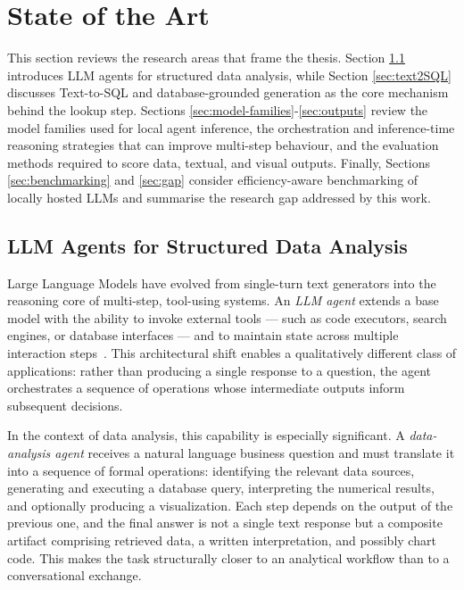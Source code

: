 \section{State of the Art}
\label{sec:stateofart}

This section reviews the research areas that frame the thesis. Section \ref{sec:LLM-data}
introduces LLM agents for structured data analysis, while Section \ref{sec:text2SQL} discusses
Text-to-SQL and database-grounded generation as the core mechanism behind the
lookup step. Sections \ref{sec:model-families}-\ref{sec:outputs} review  the model families used for local agent inference,
the orchestration and inference-time reasoning strategies that can improve
multi-step behaviour, and the evaluation methods required to score data,
textual, and visual outputs. Finally, Sections \ref{sec:benchmarking} and \ref{sec:gap} consider efficiency-aware
benchmarking of locally hosted LLMs and summarise the research gap
addressed by this work.

\subsection{LLM Agents for Structured Data Analysis}\label{sec:LLM-data}

Large Language Models have evolved from single-turn text generators into the
reasoning core of multi-step, tool-using systems.
An \textit{LLM agent} extends a base model with the ability to invoke external
tools --- such as code executors, search engines, or database interfaces --- and
to maintain state across multiple interaction steps~\cite{yao2022react}.
This architectural shift enables a qualitatively different class of applications:
rather than producing a single response to a question, the agent orchestrates a
sequence of operations whose intermediate outputs inform subsequent decisions.

In the context of data analysis, this capability is especially significant.
A \textit{data-analysis agent} receives a natural language business question and
must translate it into a sequence of formal operations: identifying the relevant
data sources, generating and executing a database query, interpreting the
numerical results, and optionally producing a visualization.
Each step depends on the output of the previous one, and the final answer is not
a single text response but a composite artifact comprising retrieved data, a
written interpretation, and possibly chart code.
This makes the task structurally closer to an analytical workflow than to a
conversational exchange.

